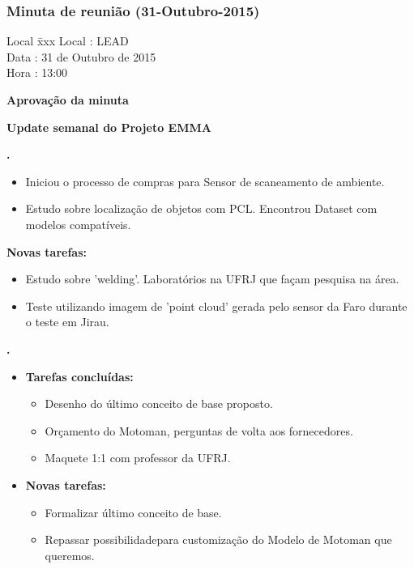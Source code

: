 \subsubsection{Minuta de reunião (31-Outubro-2015)}

\begin{tabbing}
  Local \= xxx \kill
  Local \> : LEAD \\
  Data  \> : 31 de Outubro de 2015 \\
  Hora  \> : 13:00
\end{tabbing} 


\textbf{Aprovação da minuta}

\textbf{Update semanal do Projeto EMMA}
   									
						
\textbf{\gabriel.} 
	\begin{itemize}
			\item Iniciou o processo de compras para Sensor de scaneamento de
			ambiente.
			\item Estudo sobre localização de objetos com PCL. Encontrou Dataset com
			modelos compatíveis.
			\end{itemize}
		
		\item \textbf{Novas tarefas:}
			\begin{itemize} 
				\item Estudo sobre 'welding'. Laboratórios na UFRJ que façam pesquisa na
				área.
				\item Teste utilizando imagem de 'point cloud' gerada pelo sensor da Faro
				durante o teste em Jirau.
			\end{itemize}

					
			
   \textbf{.} 
	\begin{itemize}
		\item \textbf{Tarefas concluídas:}
			\begin{itemize}    
			    \item Desenho do último conceito de base proposto.
				\item Orçamento do Motoman, perguntas de volta aos fornecedores.
				\item Maquete 1:1 com professor da UFRJ.
				
			\end{itemize}
		
		\item \textbf{Novas tarefas:}
			\begin{itemize} 
			    \item Formalizar último conceito de base.
			    \item Repassar possibilidadepara customização do Modelo de Motoman que
			    queremos.
			\end{itemize}
	\end{itemize}

